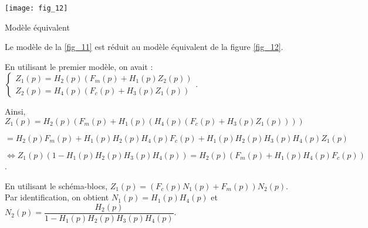 \ifprof

\else

\begin{marginfigure}
\centering
\texttt{[image: fig\_12]}
\caption{Modèle équivalent \label{fig_12}}
\end{marginfigure}

Le modèle de la  \autoref{fig_11} est réduit au modèle équivalent de la figure \autoref{fig_12}.

\fi

\ifprof
\begin{corrige}
En utilisant le premier modèle, on avait :
$
\left\{\begin{array}{l}
Z_1(p)=H_2(p)\left(F_m(p)+H_1(p)Z_2(p)\right) \\
Z_2(p)=H_4(p)\left(F_c(p)+H_3(p)Z_1(p)\right)
\end{array}
\right.
$. 

Ainsi, $Z_1(p)=H_2(p)\left(F_m(p)+H_1(p)\left( H_4(p)\left(F_c(p)+H_3(p)Z_1(p)\right)\right)\right) $

$=H_2(p)F_m(p)+H_1(p)H_2(p) H_4(p)F_c(p)+H_1(p)H_2(p) H_3(p)H_4(p)Z_1(p) $

$\Leftrightarrow Z_1(p)\left( 1-H_1(p)H_2(p) H_3(p)H_4(p)\right)=H_2(p)\left(F_m(p)+H_1(p)H_4(p)F_c(p)\right) $. 

En utilisant le schéma-blocs, $Z_1(p)=\left(F_c(p)N_1(p)+F_m(p)\right)N_2(p)$. 
Par identification, on obtient $N_1(p)=H_1(p)H_4(p)$ et $N_2(p)=\dfrac{H_2(p)}{1-H_1(p)H_2(p) H_3(p)H_4(p)}$.

\end{corrige}
\else
\fi

